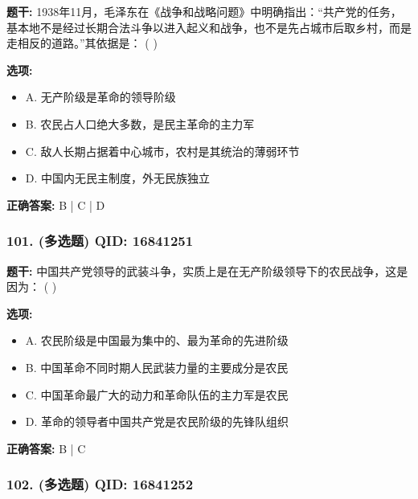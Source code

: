\documentclass[12pt,UTF8]{ctexart}
\begin{document}
\textbf{题干:}
1938年11月，毛泽东在《战争和战略问题》中明确指出：“共产党的任务，基本地不是经过长期合法斗争以进入起义和战争，也不是先占城市后取乡村，而是走相反的道路。”其依据是： ( )

\textbf{选项:}
\begin{itemize}[leftmargin=*]

  \item A. 无产阶级是革命的领导阶级

  \item B. 农民占人口绝大多数，是民主革命的主力军

  \item C. 敌人长期占据着中心城市，农村是其统治的薄弱环节

  \item D. 中国内无民主制度，外无民族独立

\end{itemize}

\textbf{正确答案:}
B | C | D

\vspace{0.3em}\hrulefill\vspace{0.7em}

\subsubsection*{101. (多选题) \small QID: 16841251}

\textbf{题干:}
中国共产党领导的武装斗争，实质上是在无产阶级领导下的农民战争，这是因为： ( )

\textbf{选项:}
\begin{itemize}[leftmargin=*]

  \item A. 农民阶级是中国最为集中的、最为革命的先进阶级

  \item B. 中国革命不同时期人民武装力量的主要成分是农民

  \item C. 中国革命最广大的动力和革命队伍的主力军是农民

  \item D. 革命的领导者中国共产党是农民阶级的先锋队组织

\end{itemize}

\textbf{正确答案:}
B | C

\vspace{0.3em}\hrulefill\vspace{0.7em}

\subsubsection*{102. (多选题) \small QID: 16841252}
\end{document}
